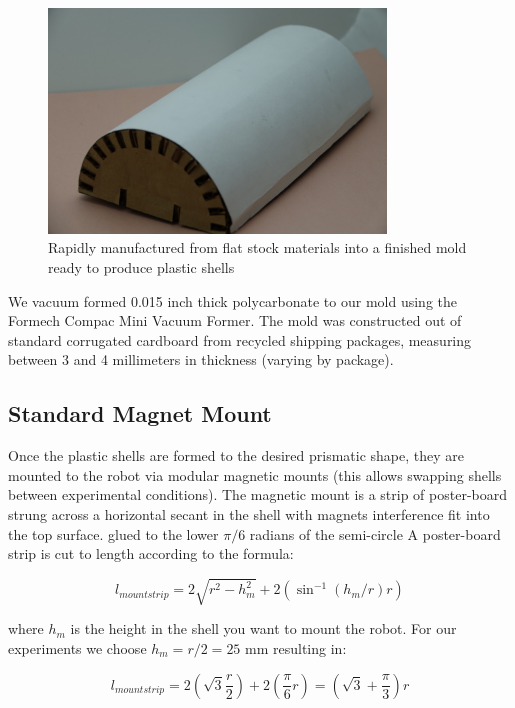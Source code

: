 \documentclass[letterpaper]{report}
\begin{document}
\begin{figure}[ht]
\centering
\includegraphics[width=0.8\textwidth]{FinishedMold.jpg}
\caption{\label{fig:Finished Mold}Rapidly manufactured from flat stock materials into a finished mold ready to produce plastic shells}
\end{figure}

We vacuum formed 0.015 inch thick polycarbonate to our mold using the Formech Compac Mini Vacuum Former.
The mold was constructed out of standard corrugated cardboard from recycled shipping packages, measuring between 3 and 4 millimeters in thickness (varying by package).


\subsection{Standard Magnet Mount}
Once the plastic shells are formed to the desired prismatic shape, they are mounted to the robot via modular magnetic mounts (this allows swapping shells between experimental conditions).
The magnetic mount is a strip of poster-board strung across a horizontal secant in the shell with magnets interference fit into the top surface.
glued to the lower $\pi/6$ radians of the semi-circle
A poster-board strip is cut to length according to the formula:

$$
l_{mountstrip} = 2 \sqrt{r^2 - h_m^2} + 2 (\sin^{-1}(h_m/r) r)
$$

where $h_m$ is the height in the shell you want to mount the robot.
For our experiments we choose $h_m = r/2 = 25$ mm resulting in:

$$
l_{mountstrip} = 2 (\sqrt{3} \frac{r}{2}) + 2 (\frac{\pi}{6} r) = (\sqrt{3} + \frac{\pi}{3} ) r
$$
\end{document}

